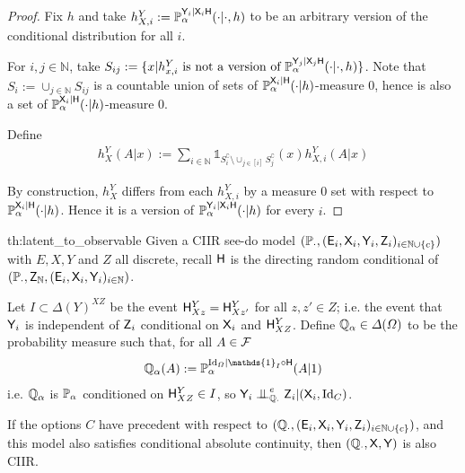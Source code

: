 \begin{proof}
Fix $h$ and take $h^Y_{X,i}:=\mathbb{P}_\alpha^{\mathsf{Y}_i|\mathsf{X}_i\mathsf{H}}(\cdot|\cdot,h)$ to be an arbitrary version of the conditional distribution for all $i$.

For $i,j\in \mathbb{N}$, take $S_{ij} := \{x|h^Y_{x,i}\text{ is not a version of }\mathbb{P}_\alpha^{\mathsf{Y}_j|\mathsf{X}_j\mathsf{H}}(\cdot|\cdot,h)\}$. Note that $S_i:= \cup_{j\in \mathbb{N}} S_{ij}$ is a countable union of sets of $\mathbb{P}_\alpha^{\mathsf{X}_i|\mathsf{H}}(\cdot|h)$-measure 0, hence is also a set of $\mathbb{P}_\alpha^{\mathsf{X}_i|\mathsf{H}}(\cdot|h)$-measure 0.

Define
\begin{align}
    h^Y_X(A|x) := \sum_{i\in \mathbb{N}} \mathds{1}_{S_i^\complement\setminus \cup_{j\in[i]}S_j^\complement}(x) h^Y_{X,i}(A|x)
\end{align}

By construction, $h^Y_X$ differs from each $h^Y_{X,i}$ by a measure 0 set with respect to $\mathbb{P}_\alpha^{\mathsf{X}_i|\mathsf{H}}(\cdot|h)$. Hence it is a version of $\mathbb{P}_\alpha^{\mathsf{Y}_i|\mathsf{X}_i\mathsf{H}}(\cdot|h)$ for every $i$.
\end{proof}

\begin{reptheorem}{th:latent_to_observable}
Given a CIIR see-do model $(\mathbb{P}_\cdot,(\mathsf{E}_i,\mathsf{X}_i,\mathsf{Y}_i,\mathsf{Z}_i)_{i\in\mathbb{N}\cup\{c\}})$ with $E,X,Y$ and $Z$ all discrete, recall $\mathsf{H}$ is the directing random conditional of $(\mathbb{P}_\cdot,\mathsf{Z}_{\mathbb{N}},(\mathsf{E}_i,\mathsf{X}_i,\mathsf{Y}_i)_{i\in \mathbb{N}})$.

Let $I\subset \Delta(Y)^{XZ}$ be the event $\mathsf{H}^Y_{Xz}=\mathsf{H}^Y_{Xz'}$ for all $z,z'\in Z$; i.e. the event that $\mathsf{Y}_i$ is independent of $\mathsf{Z}_i$ conditional on $\mathsf{X}_i$ and $\mathsf{H}^Y_{XZ}$. Define $\mathbb{Q}_\alpha\in \Delta(\Omega)$ to be the probability measure such that, for all $A\in \mathcal{F}$
\begin{align}
\prob{Q}_\alpha(A) := \prob{P}_\alpha^{\mathrm{Id}_\Omega|\mathds{1}_I\circ \RV{H}}(A|1)
\end{align}
i.e. $\mathbb{Q}_\alpha$ is $\mathbb{P}_\alpha$ conditioned on $\mathsf{H}^Y_{XZ}\in I$, so $\RV{Y}_i\CI^e_{\prob{Q}_\cdot} \RV{Z}_i|(\RV{X}_i,\mathrm{Id}_C)$.

If the options $C$ have precedent with respect to $(\mathbb{Q}_\cdot,(\mathsf{E}_i,\mathsf{X}_i,\mathsf{Y}_i,\mathsf{Z}_i)_{i\in\mathbb{N}\cup\{c\}})$, and this model also satisfies conditional absolute continuity, then $(\mathbb{Q}_\cdot,\mathsf{X},\mathsf{Y})$ is also CIIR.
\end{reptheorem}

